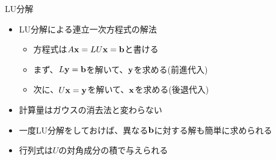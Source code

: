 \begin{frame}[t,fragile]{LU分解}
  \begin{itemize}
    \setlength{\itemsep}{1em}
  \item LU分解による連立一次方程式の解法
    \begin{itemize}
    \item 方程式は$A{\bf x} = LU{\bf x} = {\bf b}$と書ける
    \item まず、$L{\bf y} = {\bf b}$を解いて、${\bf y}$を求める(前進代入)
    \item 次に、$U{\bf x} = {\bf y}$を解いて、${\bf x}$を求める(後退代入)
    \end{itemize}
  \item 計算量はガウスの消去法と変わらない
  \item 一度LU分解をしておけば、異なる${\bf b}$に対する解も簡単に求められる
  \item 行列式は$U$の対角成分の積で与えられる
  \end{itemize}
\end{frame}
